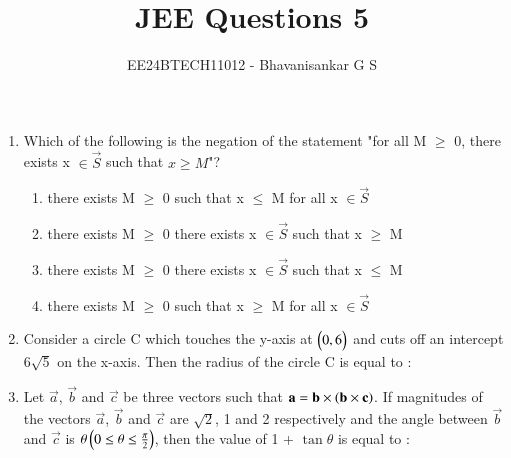 \documentclass[journal,12pt,onecolumn]{IEEEtran}
\theoremstyle{remark}
\begin{document}

\vspace{3cm}

\title{JEE Questions 5}
\author{EE24BTECH11012 - Bhavanisankar G S}
\maketitle
\newpage
\bigskip

\renewcommand{\thefigure}{\theenumi}
\renewcommand{\thetable}{\theenumi}
\begin{enumerate}
	\item Which of the following is the negation of the statement "for all M $\geq$ 0, there exists x $\in \vec{S}$ such that $x\geq M$"?
		\begin{enumerate}
			\item there exists M $\geq$ 0 such that x $\leq$ M for all x $\in \vec{S}$
			\item there exists M $\geq$ 0 there exists x $\in \vec{S}$ such that x $\geq$ M
			\item there exists M $\geq$ 0 there exists x $\in \vec{S}$ such that x $\leq$ M
			\item there exists M $\geq$ 0 such that x $\geq$ M for all x $\in \vec{S}$
		\end{enumerate}
	\item Consider a circle C which touches the y-axis at $\begin{pmatrix}0,6\end{pmatrix}$ and cuts off an intercept $6\sqrt{5}$ on the x-axis. Then the radius of the circle C is equal to :
		\begin{enumerate}
		\end{enumerate}
	\item Let $\vec{a}$, $\vec{b}$ and $\vec{c}$ be three vectors such that $\mathbf{a} = \mathbf{b} \times \left(\mathbf{b} \times \mathbf{c}\right)$. If magnitudes of the vectors $\vec{a}$, $\vec{b}$ and $\vec{c}$ are $\sqrt{2}$, 1 and 2 respectively and the angle between $\vec{b}$ and $\vec{c}$ is $\theta \left(0 \leq \theta \leq \frac{\pi}{2}\right)$, then the value of 1 + $\tan{\theta}$ is equal to :
		\begin{enumerate}
				\begin{multicols}{4}
				\item $\sqrt{3}$ + 1

\end{multicols}
\end{enumerate}
\end{enumerate}
\end{document}
